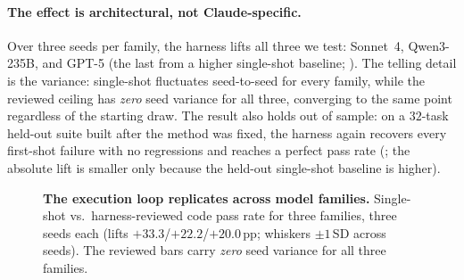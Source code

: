 \paragraph{The effect is architectural, not Claude-specific.} Over three seeds per family, the harness lifts all three we test: Sonnet~4, Qwen3-235B, and GPT-5 (the last from a higher single-shot baseline; ). The telling detail is the variance: single-shot fluctuates seed-to-seed for every family, while the reviewed ceiling has \emph{zero} seed variance for all three, converging to the same point regardless of the starting draw. The result also holds out of sample: on a $32$-task held-out suite built after the method was fixed, the harness again recovers every first-shot failure with no regressions and reaches a perfect pass rate (; the absolute lift is smaller only because the held-out single-shot baseline is higher).

\begin{figure}[t]
\centering
{}
\caption{\textbf{The execution loop replicates across model families.} Single-shot vs.\ harness-reviewed code pass rate for three families, three seeds each (lifts $+33.3$/$+22.2$/$+20.0$\,pp; whiskers $\pm1$\,SD across seeds). The reviewed bars carry \emph{zero} seed variance for all three families.}
\label{fig:crossmodel-code}
\end{figure}
